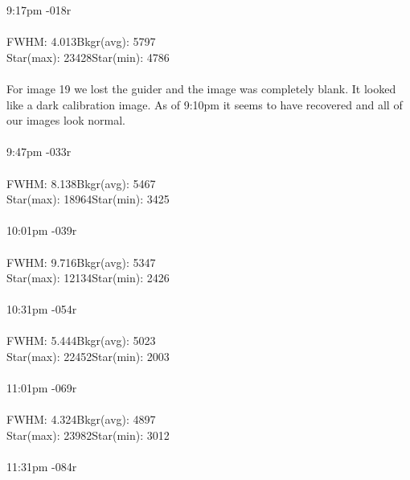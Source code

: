 \documentclass[11pt]{report}
\begin{document}
9:17pm -\hspace{97pt}018r \\ \\
FWHM: 4.013\hspace{70pt}Bkgr(avg): 5797 \\
Star(max): 23428\hspace{55pt}Star(min): 4786\\ \\
For image 19 we lost the guider and the image was completely blank. It looked like a dark calibration image. As of 9:10pm it seems to have recovered and all of our images look normal. \\ \\
9:47pm -\hspace{97pt}033r \\ \\
FWHM: 8.138\hspace{70pt}Bkgr(avg): 5467 \\
Star(max): 18964\hspace{55pt}Star(min): 3425\\ \\
10:01pm -\hspace{97pt}039r \\ \\
FWHM: 9.716\hspace{70pt}Bkgr(avg): 5347 \\
Star(max): 12134\hspace{55pt}Star(min): 2426\\ \\
10:31pm -\hspace{97pt}054r \\ \\
FWHM: 5.444\hspace{70pt}Bkgr(avg): 5023 \\
Star(max): 22452\hspace{55pt}Star(min): 2003\\ \\
11:01pm -\hspace{97pt}069r \\ \\
FWHM: 4.324\hspace{70pt}Bkgr(avg): 4897 \\
Star(max): 23982\hspace{55pt}Star(min): 3012\\ \\
11:31pm -\hspace{97pt}084r \\ \\
\end{document}
